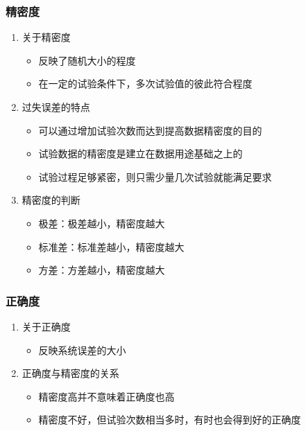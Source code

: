\documentclass[UTF8]{ctexart}
\begin{document}
\subsubsection{精密度}
\begin{enumerate}[•]
  \item 关于精密度
    \begin{itemize}
    \item 反映了随机大小的程度
    \item 在一定的试验条件下，多次试验值的彼此符合程度
    \end{itemize} 
  \item 过失误差的特点
    \begin{itemize}
    \item 可以通过增加试验次数而达到提高数据精密度的目的
    \item 试验数据的精密度是建立在数据用途基础之上的
    \item 试验过程足够紧密，则只需少量几次试验就能满足要求
   \end{itemize} 
  \item 精密度的判断
   \begin{itemize}
    \item 极差：极差越小，精密度越大
    \item 标准差：标准差越小，精密度越大
    \item 方差：方差越小，精密度越大
   \end{itemize} 
\end{enumerate}

\subsubsection{正确度}
\begin{enumerate}[•]
  \item 关于正确度
    \begin{itemize}
    \item 反映系统误差的大小
    \end{itemize} 
  \item 正确度与精密度的关系
    \begin{itemize}
    \item 精密度高并不意味着正确度也高
    \item 精密度不好，但试验次数相当多时，有时也会得到好的正确度
   \end{itemize} 
\end{enumerate}
\end{document}
